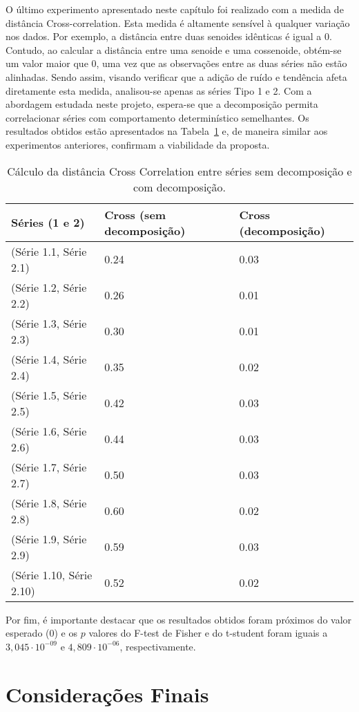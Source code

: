 O último experimento apresentado neste capítulo foi realizado com a medida de distância Cross-correlation. Esta medida é altamente sensível à qualquer variação nos dados. Por exemplo, a distância entre duas senoides idênticas é igual a $0$. Contudo, ao calcular a distância entre uma senoide e uma cossenoide, obtém-se um valor maior que $0$, uma vez que as observações entre as duas séries não estão alinhadas. Sendo assim, visando verificar que a adição de ruído e tendência afeta diretamente esta medida, analisou-se apenas as séries Tipo 1 e 2. Com a abordagem estudada neste projeto, espera-se que a decomposição permita correlacionar séries com comportamento determinístico semelhantes. Os resultados obtidos estão apresentados na Tabela~\ref{cross} e, de maneira similar aos experimentos anteriores, confirmam a viabilidade da proposta. 


\begin{table}[!ht]
\centering
\caption{Cálculo da distância Cross Correlation entre séries sem decomposição e com decomposição.}
\begin{tabular}{lll}
 \hline
Séries (1 e 2) & Cross (sem decomposição) & Cross (decomposição) \\
 \hline
(Série 1.1, Série 2.1)  & 0.24 & 0.03 \\ 
(Série 1.2, Série 2.2)  &  0.26  & 0.01 \\
(Série 1.3, Série 2.3)  &  0.30 & 0.01 \\ 
(Série 1.4, Série 2.4)  &  0.35 & 0.02 \\ 
(Série 1.5, Série 2.5)  & 0.42 & 0.03  \\
(Série 1.6, Série 2.6)  & 0.44 & 0.03 \\
(Série 1.7, Série 2.7)  & 0.50 & 0.03 \\ 
(Série 1.8, Série 2.8)  & 0.60 & 0.02 \\
(Série 1.9, Série 2.9)  & 0.59 & 0.03 \\ 
(Série 1.10, Série 2.10)  & 0.52 & 0.02 \\
\hline
\end{tabular}
\label{cross}
\end{table}

Por fim, é importante destacar que os resultados obtidos foram próximos do valor esperado ($0$) e os $p$ valores do F-test de Fisher e do t-student foram iguais a $3,045 \cdot 10^{-09}$ e $4,809 \cdot 10^{-06}$, respectivamente.

\section{Considerações Finais}

